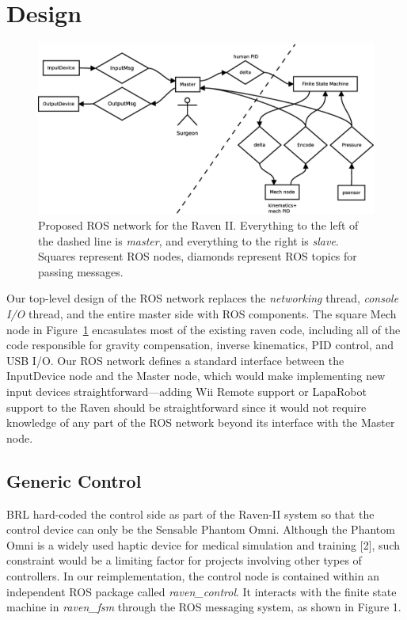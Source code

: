 \documentclass[letterpaper,twocolumn,10pt]{article}
\begin{document}
\section{Design}

\begin{figure}[ht!]
  \begin{center}
    \includegraphics[width=1.0\textwidth]{ros_high_level_v2.eps}
  \end{center}
  \caption{Proposed ROS network for the Raven II. Everything to the
    left of the dashed line is \emph{master}, and everything to the
    right is \emph{slave}. Squares represent ROS nodes, diamonds
    represent ROS topics for passing messages.}
  \label{fig:ros_network}
\end{figure}

Our top-level design of the ROS network replaces the \emph{networking}
thread, \emph{console I/O} thread, and the entire master side with ROS
components. The square Mech node in Figure~\ref{fig:ros_network}
encasulates most of the existing raven code, including all of the code
responsible for gravity compensation, inverse kinematics, PID control,
and USB I/O. Our ROS network defines a standard interface between the
InputDevice node and the Master node, which would make implementing
new input devices straightforward---adding Wii Remote support or
LapaRobot support to the Raven should be straightforward since it
would not require knowledge of any part of the ROS network beyond its
interface with the Master node.

\subsection{Generic Control}

BRL hard-coded the control side as part of the Raven-II system so that
the control device can only be the Sensable Phantom Omni. Although the
Phantom Omni is a widely used haptic device for medical simulation and
training [2], such constraint would be a limiting factor for projects
involving other types of controllers. In our reimplementation, the
control node is contained within an independent ROS package called
{\it raven\_control}. It interacts with the finite state machine in
{\it raven\_fsm} through the ROS messaging system, as shown in Figure
1.
\end{document}
